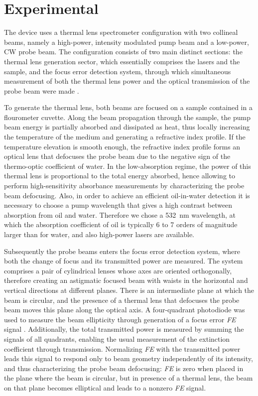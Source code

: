 \documentclass[10pt,authoryear,twocolumn]{article}
\newcommand{\FE}{\textit{FE}}
\begin{document}
\section{Experimental}
\label{Experimental}

The device uses a thermal lens spectrometer configuration with two collineal beams, namely a high-power, intensity modulated pump beam and a low-power, CW probe beam. The configuration consists of two main distinct sections: the thermal lens generation sector, which essentially comprises the lasers and the sample, and the focus error detection system, through which simultaneous measurement of both the thermal lens power and the optical transmission of the probe beam were made \citep{Domene2017}.

To generate the thermal lens, both beams are focused on a sample contained in a flourometer cuvette. Along the beam propagation through the sample, the pump beam energy is partially absorbed and dissipated as heat, thus locally increasing the temperature of the medium and generating a refractive index profile. If the temperature elevation is smooth enough, the refractive index profile forms an optical lens that defocuses the probe beam due to the negative sign of the thermo-optic coefficient of water. In the low-absorption regime, the power of this thermal lens is proportional to the total energy absorbed, hence allowing to perform high-sensitivity absorbance measurements by characterizing the probe beam defocusing. Also, in order to achieve an efficient oil-in-water detection it is necessary to choose a pump wavelength that gives a high contrast between absorption from oil and water. Therefore we chose a \SI{532}{\nano\metre} wavelength, at which the absorption coefficient of oil is typically \SI{6}{} to \SI{7}{} orders of magnitude larger than for water, and also high-power lasers are available.

Subsequently the probe beams enters the focus error detection system, where both the change of focus and its transmitted power are measured. The system comprises a pair of cylindrical lenses whose axes are oriented orthogonally, therefore creating an astigmatic focused beam with waists in the horizontal and vertical directions at different planes. There is an intermediate plane at which the beam is circular, and the presence of a thermal lens that defocuses the probe beam moves this plane along the optical axis. A four-quadrant photodiode was used to measure the beam ellipticity through generation of a focus error \FE{} signal \citep{Domene2017}. Additionally, the total transmitted power is measured by summing the signals of all quadrants, enabling the usual measurement of the extinction coefficient through transmission. Normalizing \FE{} with the transmitted power leads this signal to respond only to beam geometry independently of its intensity, and thus characterizing the probe beam defocusing: \FE{} is zero when placed in the plane where the beam is circular, but in presence of a thermal lens, the beam on that plane becomes elliptical and leads to a nonzero \FE{} signal. \\
\end{document}
